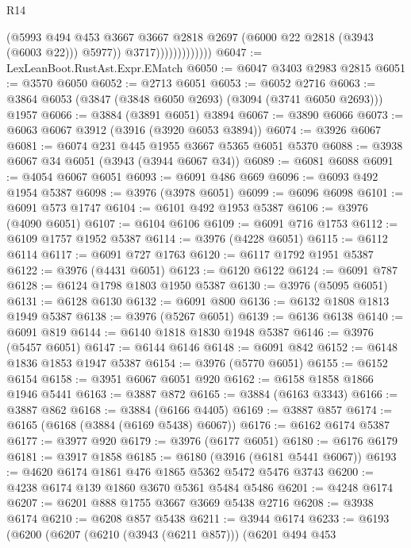 \begin{lexlean}{R14}
\begin{coremodule}
                                (@5993
                                  @494
                                  @453
                                  @3667
                                  @3667
                                  @2818
                                  @2697
                                  (@6000 @22 @2818 (@3943 (@6003 @22)))
                                  @5977))
                              @3717)))))))))))))
@6047 := LexLeanBoot.RustAst.Expr.EMatch
@6050 := @6047 @3403 @2983 @2815
@6051 := @3570 @6050
@6052 := @2713 @6051
@6053 := @6052 @2716
@6063 := @3864 @6053 (@3847 (@3848 @6050 @2693) (@3094 (@3741 @6050 @2693))) @1957
@6066 := @3884 (@3891 @6051) @3894
@6067 := @3890 @6066
@6073 := @6063 @6067 @3912 (@3916 (@3920 @6053 @3894))
@6074 := @3926 @6067
@6081 := @6074 @231 @445 @1955 @3667 @5365 @6051 @5370
@6088 := @3938 @6067 @34 @6051 (@3943 (@3944 @6067 @34))
@6089 := @6081 @6088
@6091 := @4054 @6067 @6051
@6093 := @6091 @486 @669
@6096 := @6093 @492 @1954 @5387
@6098 := @3976 (@3978 @6051)
@6099 := @6096 @6098
@6101 := @6091 @573 @1747
@6104 := @6101 @492 @1953 @5387
@6106 := @3976 (@4090 @6051)
@6107 := @6104 @6106
@6109 := @6091 @716 @1753
@6112 := @6109 @1757 @1952 @5387
@6114 := @3976 (@4228 @6051)
@6115 := @6112 @6114
@6117 := @6091 @727 @1763
@6120 := @6117 @1792 @1951 @5387
@6122 := @3976 (@4431 @6051)
@6123 := @6120 @6122
@6124 := @6091 @787
@6128 := @6124 @1798 @1803 @1950 @5387
@6130 := @3976 (@5095 @6051)
@6131 := @6128 @6130
@6132 := @6091 @800
@6136 := @6132 @1808 @1813 @1949 @5387
@6138 := @3976 (@5267 @6051)
@6139 := @6136 @6138
@6140 := @6091 @819
@6144 := @6140 @1818 @1830 @1948 @5387
@6146 := @3976 (@5457 @6051)
@6147 := @6144 @6146
@6148 := @6091 @842
@6152 := @6148 @1836 @1853 @1947 @5387
@6154 := @3976 (@5770 @6051)
@6155 := @6152 @6154
@6158 := @3951 @6067 @6051 @920
@6162 := @6158 @1858 @1866 @1946 @5441
@6163 := @3887 @872
@6165 := @3884 (@6163 @3343)
@6166 := @3887 @862
@6168 := @3884 (@6166 @4405)
@6169 := @3887 @857
@6174 := @6165 (@6168 (@3884 (@6169 @5438) @6067))
@6176 := @6162 @6174 @5387
@6177 := @3977 @920
@6179 := @3976 (@6177 @6051)
@6180 := @6176 @6179
@6181 := @3917 @1858
@6185 := @6180 (@3916 (@6181 @5441 @6067))
@6193 := @4620 @6174 @1861 @476 @1865 @5362 @5472 @5476 @3743
@6200 := @4238 @6174 @139 @1860 @3670 @5361 @5484 @5486
@6201 := @4248 @6174
@6207 := @6201 @888 @1755 @3667 @3669 @5438 @2716
@6208 := @3938 @6174
@6210 := @6208 @857 @5438
@6211 := @3944 @6174
@6233 := @6193
    (@6200
      (@6207
        (@6210 (@3943 (@6211 @857)))
        (@6201
          @494
          @453

\end{coremodule}
\end{lexlean}

